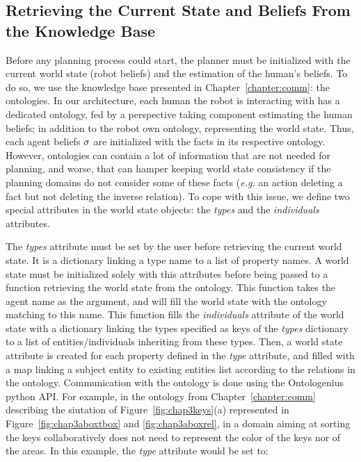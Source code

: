 \documentclass[a4paper,11pt,twoside]{StyleThese}
\begin{document}
\subsection{Retrieving the Current State and Beliefs From the Knowledge Base}
Before any planning process could start, the planner must be initialized with the current world state (robot beliefs) and the estimation of the human's beliefs. To do so, we use the knowledge base presented in Chapter~\ref{chapter:comm}: the ontologies. In our architecture, each human the robot is interacting with has a dedicated ontology, fed by a perspective taking component estimating the human beliefs; in addition to the robot own ontology, representing the world state. Thus, each agent beliefs $\sigma$ are initialized with the facts in its respective ontology.
However, ontologies can contain a lot of information that are not needed for planning, and worse, that can hamper keeping world state consistency if the planning domains do not consider some of these facts (\textit{e.g.} an action deleting a fact but not deleting the inverse relation). To cope with this issue, we define two special attributes in the world state objects: the \textit{types} and the \textit{individuals} attributes.

The \textit{types} attribute must be set by the user before retrieving the current world state. It is a dictionary linking a type name to a list of property names. A world state must be initialized solely with this attributes before being passed to a function retrieving the world state from the ontology. This function takes the agent name as the argument, and will fill the world state with the ontology matching to this name. This function fills the \textit{individuals} attribute of the world state with a dictionary linking the types specified as keys of the  \textit{types} dictionary to a list of entities/individuals inheriting from these types. Then, a world state attribute is created for each property defined in the \textit{type} attribute, and filled with a map linking a subject entity to existing entities list according to the relations in the ontology. Communication with the ontology is done using the Ontologenius~\cite{sarthou2019ontologenius} python API. For example, in the ontology from Chapter~\ref{chapter:comm} describing the siutation of Figure~\ref{fig:chap3keys}(a) represented in Figure~\ref{fig:chap3aboxtbox} and \ref{fig:chap3aboxrel}, in a domain aiming at sorting the keys collaboratively does not need to represent the color of the keys nor of the areas. In this example, the \textit{type} attribute would be set to: 
\end{document}
